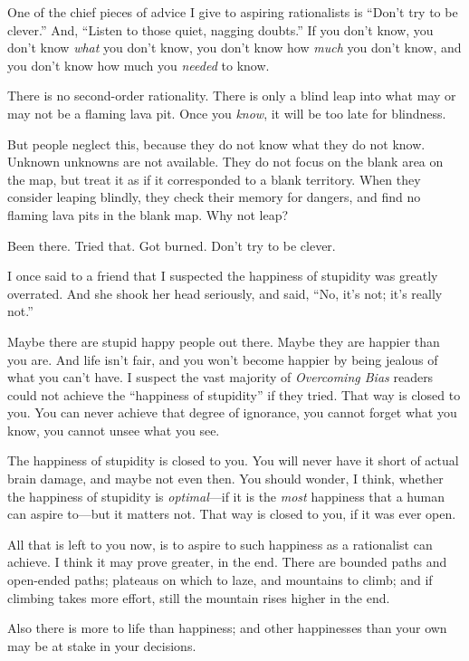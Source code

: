 {
 One of the chief pieces of advice I give to aspiring rationalists
is ``Don't try to be
clever.'' And, ``Listen to those
quiet, nagging doubts.'' If you don't
know, you don't know \textit{what} you
don't know, you don't know how
\textit{much} you don't know, and you
don't know how much you \textit{needed} to know.}

{
 There is no second-order rationality. There is only a blind leap
into what may or may not be a flaming lava pit. Once you \textit{know},
it will be too late for blindness.}

{
 But people neglect this, because they do not know what they do not
know. Unknown unknowns are not available. They do not focus on the
blank area on the map, but treat it as if it corresponded to a blank
territory. When they consider leaping blindly, they check their memory
for dangers, and find no flaming lava pits in the blank map. Why not
leap?}

{
 Been there. Tried that. Got burned. Don't try to
be clever.}

{
 I once said to a friend that I suspected the happiness of
stupidity was greatly overrated. And she shook her head seriously, and
said, ``No, it's not;
it's really not.''}

{
 Maybe there are stupid happy people out there. Maybe they are
happier than you are. And life isn't fair, and you
won't become happier by being jealous of what you
can't have. I suspect the vast majority of
\textit{Overcoming Bias} readers could not achieve the
``happiness of stupidity'' if they
tried. That way is closed to you. You can never achieve that degree of
ignorance, you cannot forget what you know, you cannot unsee what you
see.}

{
 The happiness of stupidity is closed to you. You will never have
it short of actual brain damage, and maybe not even then. You should
wonder, I think, whether the happiness of stupidity is
\textit{optimal}{}---if it is the \textit{most} happiness that a human
can aspire to---but it matters not. That way is closed to you, if it
was ever open.}

{
 All that is left to you now, is to aspire to such happiness as a
rationalist can achieve. I think it may prove greater, in the end.
There are bounded paths and open-ended paths; plateaus on which to
laze, and mountains to climb; and if climbing takes more effort, still
the mountain rises higher in the end.}

{
 Also there is more to life than happiness; and other happinesses
than your own may be at stake in your decisions.}

